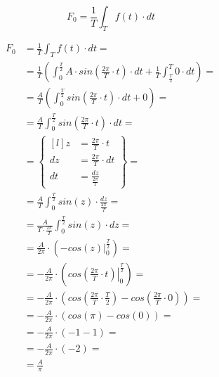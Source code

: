 \begin{task}

\begin{equation}
F_0=\frac{1}{T}\int_{T}f(t) \cdot dt
\end{equation}


\begin{align*}
F_0&=\frac{1}{T}\int_{T}f(t) \cdot dt=\\
&=\frac{1}{T}\left(\int_{0}^{\frac{T}{2}}A \cdot sin\left( \frac{2\pi}{T} \cdot t\right) \cdot dt 
+ \frac{1}{T}\int_{\frac{T}{2}}^{T}0 \cdot dt \right)=\\
&=\frac{A}{T}\left(\int_{0}^{\frac{T}{2}}sin\left( \frac{2\pi}{T} \cdot t\right) \cdot dt 
+ 0 \right)=\\
&=\frac{A}{T}\int_{0}^{\frac{T}{2}}sin\left( \frac{2\pi}{T} \cdot t\right) \cdot dt=\\
&=\begin{Bmatrix*}[l]
z&=\frac{2\pi}{T} \cdot t\\
dz&=\frac{2\pi}{T} \cdot dt\\
dt&=\frac{dz}{\frac{2\pi}{T}}
\end{Bmatrix*}=\\
&=\frac{A}{T}\int_{0}^{\frac{T}{2}}sin\left( z\right) \cdot \frac{dz}{\frac{2\pi}{T}}=\\
&=\frac{A}{T\cdot \frac{2\pi}{T}}\int_{0}^{\frac{T}{2}}sin\left( z\right) \cdot dz=\\
&=\frac{A}{2\pi}\cdot \left(\left . -cos\left( z\right) \right|_{0}^{\frac{T}{2}}\right)=\\
&=-\frac{A}{2\pi}\cdot \left(\left . cos\left( \frac{2\pi}{T} \cdot t\right) \right|_{0}^{\frac{T}{2}}\right)=\\
&=-\frac{A}{2\pi}\cdot \left( cos\left( \frac{2\pi}{T} \cdot \frac{T}{2}\right) - cos\left( \frac{2\pi}{T} \cdot 0\right)\right)=\\
&=-\frac{A}{2\pi}\cdot \left( cos\left( \pi\right) - cos\left( 0\right)\right)=\\
&=-\frac{A}{2\pi}\cdot \left( -1 - 1\right)=\\
&=-\frac{A}{2\pi}\cdot \left( -2\right)=\\
&=\frac{A}{\pi}
\end{align*}



\end{task}
